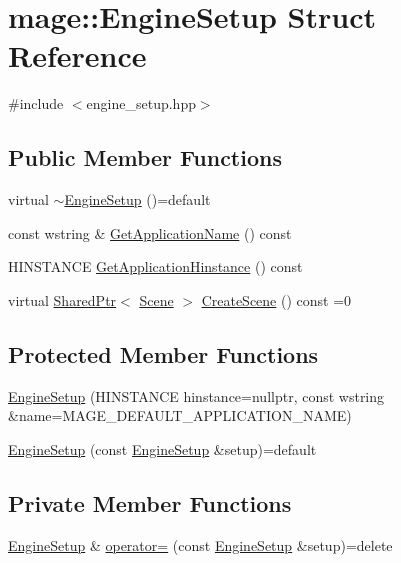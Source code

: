 \hypertarget{structmage_1_1_engine_setup}{}\section{mage\+:\+:Engine\+Setup Struct Reference}
\label{structmage_1_1_engine_setup}


{\ttfamily \#include $<$engine\+\_\+setup.\+hpp$>$}

\subsection*{Public Member Functions}
\begin{DoxyCompactItemize}
\item 
virtual \hyperlink{structmage_1_1_engine_setup_a77de1ad7e922dec4791b558d20616b08}{$\sim$\+Engine\+Setup} ()=default
\item 
const wstring \& \hyperlink{structmage_1_1_engine_setup_a63fed5e978c020ebc9d5080fe6fcefdc}{Get\+Application\+Name} () const
\item 
H\+I\+N\+S\+T\+A\+N\+CE \hyperlink{structmage_1_1_engine_setup_a2d9220896adfe924ac72165b4e2b13cf}{Get\+Application\+Hinstance} () const
\item 
virtual \hyperlink{namespacemage_a1e01ae66713838a7a67d30e44c67703e}{Shared\+Ptr}$<$ \hyperlink{classmage_1_1_scene}{Scene} $>$ \hyperlink{structmage_1_1_engine_setup_a004fce6a741fc68c8f6feed546d9f220}{Create\+Scene} () const =0
\end{DoxyCompactItemize}
\subsection*{Protected Member Functions}
\begin{DoxyCompactItemize}
\item 
\hyperlink{structmage_1_1_engine_setup_a5a19cf91bfd8cea940abbbbbdd1828a1}{Engine\+Setup} (H\+I\+N\+S\+T\+A\+N\+CE hinstance=nullptr, const wstring \&name=M\+A\+G\+E\+\_\+\+D\+E\+F\+A\+U\+L\+T\+\_\+\+A\+P\+P\+L\+I\+C\+A\+T\+I\+O\+N\+\_\+\+N\+A\+ME)
\item 
\hyperlink{structmage_1_1_engine_setup_a40980f5fce1554c2a93707efdf4486a9}{Engine\+Setup} (const \hyperlink{structmage_1_1_engine_setup}{Engine\+Setup} \&setup)=default
\end{DoxyCompactItemize}
\subsection*{Private Member Functions}
\begin{DoxyCompactItemize}
\item 
\hyperlink{structmage_1_1_engine_setup}{Engine\+Setup} \& \hyperlink{structmage_1_1_engine_setup_ad7066882519b59ca533293f743334508}{operator=} (const \hyperlink{structmage_1_1_engine_setup}{Engine\+Setup} \&setup)=delete
\end{DoxyCompactItemize}
